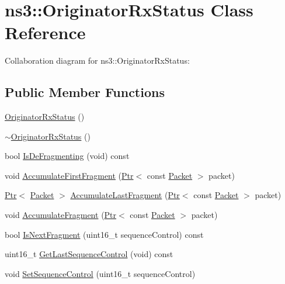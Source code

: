 \hypertarget{classns3_1_1OriginatorRxStatus}{}\section{ns3\+:\+:Originator\+Rx\+Status Class Reference}
\label{classns3_1_1OriginatorRxStatus}


Collaboration diagram for ns3\+:\+:Originator\+Rx\+Status\+:
\subsection*{Public Member Functions}
\begin{DoxyCompactItemize}
\item 
\hyperlink{classns3_1_1OriginatorRxStatus_a8c1a20eee39b257ad3936bc0dfc357d2}{Originator\+Rx\+Status} ()
\item 
\hyperlink{classns3_1_1OriginatorRxStatus_a0af3a91befe91ca1d4f9ef9c7b7cd8c4}{$\sim$\+Originator\+Rx\+Status} ()
\item 
bool \hyperlink{classns3_1_1OriginatorRxStatus_a451e62ee6bc1673d88c9e9080509e7ed}{Is\+De\+Fragmenting} (void) const 
\item 
void \hyperlink{classns3_1_1OriginatorRxStatus_ab5207cf1d5f638e0ad6060e0e99e63f4}{Accumulate\+First\+Fragment} (\hyperlink{classns3_1_1Ptr}{Ptr}$<$ const \hyperlink{classns3_1_1Packet}{Packet} $>$ packet)
\item 
\hyperlink{classns3_1_1Ptr}{Ptr}$<$ \hyperlink{classns3_1_1Packet}{Packet} $>$ \hyperlink{classns3_1_1OriginatorRxStatus_a59c38c4a21335b5e82da00fdb0561af0}{Accumulate\+Last\+Fragment} (\hyperlink{classns3_1_1Ptr}{Ptr}$<$ const \hyperlink{classns3_1_1Packet}{Packet} $>$ packet)
\item 
void \hyperlink{classns3_1_1OriginatorRxStatus_a04fe6973f8994674573a379c175ae40d}{Accumulate\+Fragment} (\hyperlink{classns3_1_1Ptr}{Ptr}$<$ const \hyperlink{classns3_1_1Packet}{Packet} $>$ packet)
\item 
bool \hyperlink{classns3_1_1OriginatorRxStatus_a68f41bc64c3c52aa0eddc16072575729}{Is\+Next\+Fragment} (uint16\+\_\+t sequence\+Control) const 
\item 
uint16\+\_\+t \hyperlink{classns3_1_1OriginatorRxStatus_a0bda0c47194c7a4d36beec9dcbe81a74}{Get\+Last\+Sequence\+Control} (void) const 
\item 
void \hyperlink{classns3_1_1OriginatorRxStatus_a3aedb9f27b6dabbc021ac30e117bce02}{Set\+Sequence\+Control} (uint16\+\_\+t sequence\+Control)
\end{DoxyCompactItemize}
